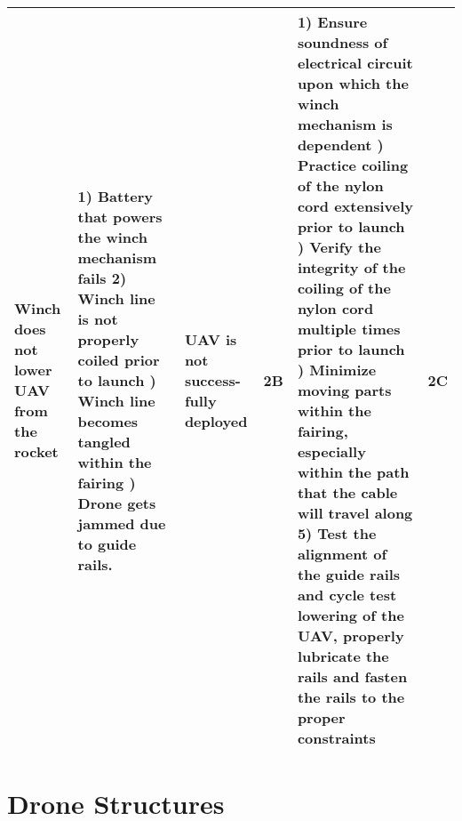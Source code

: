 \begin{table}[H]
{\begin{tabularx}{\linewidth}{XXXlXl}
					Winch does not lower UAV from the rocket & 1) Battery that powers the winch mechanism fails 2) Winch line is not properly coiled prior to launch \newline 3) Winch line becomes tangled within the fairing \newline 4) Drone gets jammed due to guide rails. & UAV is not success-fully deployed & \cellcolor{red!25} 2B & 1) Ensure soundness of electrical circuit upon which the winch mechanism is dependent \newline 2) Practice coiling of the nylon cord extensively prior to launch \newline 3) Verify the integrity of the coiling of the nylon cord multiple times prior to launch \newline 4) Minimize moving parts within the fairing, especially within the path that the cable will travel along 5) Test the alignment of the guide rails and cycle test lowering of the UAV, properly lubricate the rails and fasten the rails to the proper constraints & \cellcolor{orange!25} 2C \\
					\bottomrule
					\end{tabularx}
					}
				\end{table}

	\section{Drone Structures}\label{PL:Design:Structures}
